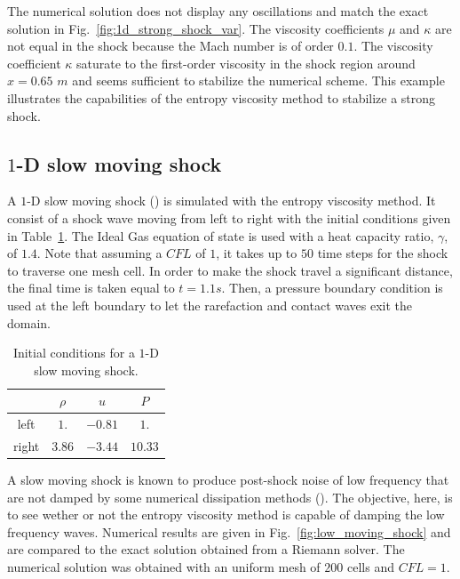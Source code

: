 \documentclass[preprint,10pt]{elsarticle}
\newcommand{\fig}[1]{Fig.~\ref{#1}}                      %
\newcommand{\tbl}[1]{Table~\ref{#1}}                     %
\begin{document}
The numerical solution does not display any oscillations and match the exact solution in \fig{fig:1d_strong_shock_var}. The viscosity coefficients $\mu$ and $\kappa$ are not equal in the shock because the Mach number is of order $0.1$. The viscosity coefficient $\kappa$ saturate to the first-order viscosity in the shock region around $x = 0.65$ $m$ and seems sufficient to stabilize the numerical scheme. This example illustrates the capabilities of the entropy viscosity method to stabilize a strong shock. 
\subsection{$1$-D slow moving shock} \label{sec:slow_moving_shock}
A $1$-D slow moving shock (\cite{james}) is simulated with the entropy viscosity method. It consist of a shock wave moving from left to right with the initial conditions given in \tbl{tbl:ic_slow_moving}. The Ideal Gas equation of state is used with a heat capacity ratio, $\gamma$, of $1.4$. Note that assuming a $CFL$ of $1$, it takes up to $50$ time steps for the shock to traverse one mesh cell. In order to make the shock travel a significant distance, the final time is taken equal to $t=1.1s$. Then, a pressure boundary condition is used at the left boundary to let the rarefaction and contact waves exit the domain.   
\begin{table}[H]
\begin{center}
 \caption{\label{tbl:ic_slow_moving} Initial conditions for a $1$-D slow moving shock.}
 \begin{tabular}{|c|c|c|c|}
 \hline
   & $\rho$ & $u$ & $P$ \\
 \hline
left & $1.$ & $-0.81$ & $1.$ \\
  \hline
  right & $3.86$ & $-3.44$ & $10.33$ \\
  \hline
\end{tabular}
\end{center}
\nonumber
\end{table}
A slow moving shock is known to produce post-shock noise of low frequency that are not damped by some numerical dissipation methods (\cite{james}). The objective, here, is to see wether or not the entropy viscosity method is capable of damping the low frequency waves. Numerical results are given in \fig{fig:low_moving_shock} and are compared to the exact solution obtained from a Riemann solver. The numerical solution was obtained with an uniform mesh of $200$ cells and $CFL=1$.
\end{document}
